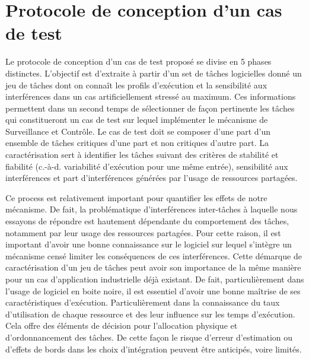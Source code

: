 \documentclass[french, a4paper, 11pt, twoside, pdftex]{StyleThese}
\begin{document}
        \section{Protocole de conception d'un cas de test}
        
        Le protocole de conception d'un cas de test proposé se divise en 5 phases distinctes. L'objectif est d'extraite à partir d'un set de tâches logicielles donné un jeu de tâches dont on connaît les profils d'exécution et la sensibilité aux interférences dans un cas artificiellement stressé au maximum. Ces informations permettent dans un second temps de sélectionner de façon pertinente les tâches qui constitueront un cas de test sur lequel implémenter le mécanisme de Surveillance et Contrôle. Le cas de test doit se composer d'une part d'un ensemble de tâches critiques d'une part et non critiques d'autre part. La caractérisation sert à identifier les tâches suivant des critères de stabilité et fiabilité (c.-à-d. variabilité d'exécution pour une même entrée), sensibilité aux interférences et part d'interférences générées par l'usage de ressources partagées.
        
        Ce process est relativement important pour quantifier les effets de notre mécanisme. De fait, la problématique d'interférences inter-tâches à laquelle nous essayons de répondre est hautement dépendante du comportement des tâches, notamment par leur usage des ressources partagées. Pour cette raison, il est important d'avoir une bonne connaissance sur le logiciel sur lequel s'intègre un mécanisme censé limiter les conséquences de ces interférences. Cette démarque de caractérisation d'un jeu de tâches peut avoir son importance de la même manière pour un cas d'application industrielle déjà existant. De fait, particulièrement dans l'usage de logiciel en boite noire, il est essentiel d'avoir une bonne maîtrise de ses caractéristiques d'exécution. Particulièrement dans la connaissance du taux d'utilisation de chaque ressource et des leur influence sur les temps d'exécution. Cela offre des éléments de décision pour l'allocation physique et d'ordonnancement des tâches. De cette façon le risque d'erreur d'estimation ou d'effets de bords dans les choix d'intégration peuvent être anticipés, voire limités.
        
\end{document}
